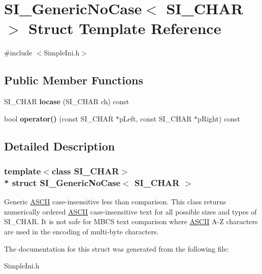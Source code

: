 \hypertarget{a00277}{}\section{S\+I\+\_\+\+Generic\+No\+Case$<$ S\+I\+\_\+\+C\+H\+AR $>$ Struct Template Reference}
\label{a00277}


{\ttfamily \#include $<$Simple\+Ini.\+h$>$}

\subsection*{Public Member Functions}
\begin{DoxyCompactItemize}
\item 
S\+I\+\_\+\+C\+H\+AR {\bfseries locase} (S\+I\+\_\+\+C\+H\+AR ch) const \hypertarget{a00277_adc6bb2ca8960d24913b598a2f3085e7c}{}\label{a00277_adc6bb2ca8960d24913b598a2f3085e7c}

\item 
bool {\bfseries operator()} (const S\+I\+\_\+\+C\+H\+AR $\ast$p\+Left, const S\+I\+\_\+\+C\+H\+AR $\ast$p\+Right) const \hypertarget{a00277_aa8014f86b3d74b2cd0f6e9b6ccc43426}{}\label{a00277_aa8014f86b3d74b2cd0f6e9b6ccc43426}

\end{DoxyCompactItemize}


\subsection{Detailed Description}
\subsubsection*{template$<$class S\+I\+\_\+\+C\+H\+AR$>$\\*
struct S\+I\+\_\+\+Generic\+No\+Case$<$ S\+I\+\_\+\+C\+H\+A\+R $>$}

Generic \hyperlink{a00038}{A\+S\+C\+II} case-\/insensitive less than comparison. This class returns numerically ordered \hyperlink{a00038}{A\+S\+C\+II} case-\/insensitive text for all possible sizes and types of S\+I\+\_\+\+C\+H\+AR. It is not safe for M\+B\+CS text comparison where \hyperlink{a00038}{A\+S\+C\+II} A-\/Z characters are used in the encoding of multi-\/byte characters. 

The documentation for this struct was generated from the following file\+:\begin{DoxyCompactItemize}
\item 
Simple\+Ini.\+h\end{DoxyCompactItemize}
